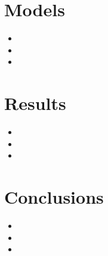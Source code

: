 \documentclass{article}
\begin{document}
    \section{Models}
    \begin{itemize}
    	\item 
    	\item 
    	\item 
    \end{itemize}

%			
%			

\section{Results}


\begin{itemize}
	\item 
	\item 
	\item 
\end{itemize}

\section{Conclusions}
\begin{itemize}
	\item 
	\item 
	\item 
\end{itemize}
\end{document}
